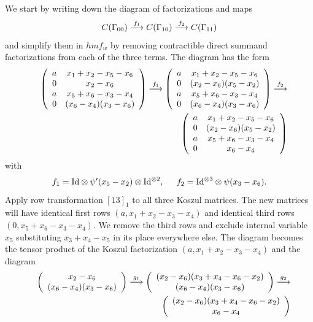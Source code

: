 \documentclass[12pt]{article}
\begin{document}
We start by writing down the diagram of factorizations and maps 
$$ C(\Gamma_{00}) \stackrel{f_1}{\longrightarrow} C(\Gamma_{10}) 
\stackrel{f_2}{\longrightarrow}C(\Gamma_{11})$$ 
and simplify them in $hmf_w$ by removing contractible direct 
summand factorizations from each of the three terms. The diagram 
has the form 
\begin{eqnarray*} 
& & \left( \begin{array}{cc} a & x_1+ x_2-x_5 -x_6 \\ 0  & x_2-x_6 \\
  a & x_5 + x_6 -x_3 -x_4 \\ 0 & (x_6-x_4)(x_3-x_6) \end{array}
   \right) \stackrel{f_1}{\longrightarrow} 
  \left( \begin{array}{cc} a & x_1+ x_2-x_5 -x_6 \\ 0 & (x_2-x_6)(x_5-x_2) \\
  a & x_5 + x_6 -x_3 -x_4 \\ 0 & (x_6-x_4)(x_3-x_6) \end{array}
   \right) \stackrel{f_2}{\longrightarrow}  \\
& & \left( \begin{array}{cc} a & x_1+ x_2-x_5 -x_6 \\ 0 & (x_2-x_6)(x_5-x_2) \\
  a & x_5 + x_6 -x_3 -x_4 \\ 0 & x_6-x_4 \end{array}
   \right)
\end{eqnarray*} 
with 
$$f_1= \mathrm{Id} \otimes \psi'(x_5-x_2) \otimes \mathrm{Id}^{\otimes 2}, 
 \hspace{0.2in} 
  f_2= \mathrm{Id}^{\otimes 3} \otimes \psi(x_3-x_6).$$ 
Apply row transformation $[13]_1$ to all three Koszul matrices. 
The new matrices will have identical first rows 
$(a, x_1+x_2-x_3-x_4)$ and identical third rows $(0, x_5+x_6-x_3-x_4).$
We remove the third rows and exclude internal variable $x_5$ substituting 
$x_3+x_4-x_5$ in its place everywhere else. The diagram becomes the 
tensor product of the Koszul factorization $(a, x_1+x_2-x_3-x_4)$  
and the diagram 
\begin{eqnarray*} 
& & 
 \left( \begin{array}{c} x_2-x_6 \\ (x_6-x_4)(x_3-x_6) \end{array} 
  \right) \stackrel{g_1}{\longrightarrow} 
  \left( \begin{array}{c} (x_2-x_6)(x_3+x_4-x_6-x_2) \\ (x_6-x_4)(x_3-x_6) 
  \end{array} \right) \stackrel{g_2}{\longrightarrow} \\ 
& &  \left( \begin{array}{c} (x_2-x_6)(x_3+x_4-x_6-x_2) \\ x_6-x_4 
  \end{array} \right)
\end{eqnarray*} 
\end{document}
